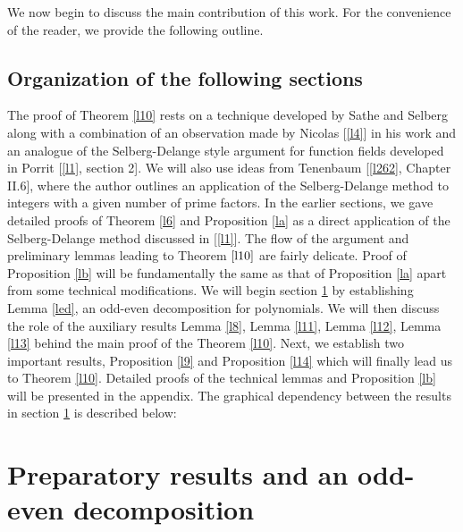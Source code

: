 \documentclass[12pt]{amsart}
\numberwithin{equation}{section}
\theoremstyle{remark}
\theoremstyle{remark}
\theoremstyle{definition}
\begin{document}
We now begin to discuss the main contribution of this work. For the convenience of the reader, we provide the following outline.
\subsection{Organization of the following sections} The proof of Theorem \ref{l10} rests on a technique developed by Sathe and Selberg along with a combination of an observation made by Nicolas [\ref{l4}] in his work and an analogue of the Selberg-Delange style argument for function fields developed in Porrit [\ref{l1}, section 2]. We will also use ideas from Tenenbaum [\ref{l262}, Chapter II.6], where the author outlines an application of the Selberg-Delange method to integers with a given number of prime factors. In the earlier sections, we gave detailed proofs of Theorem \ref{l6} and Proposition \ref{la} as a direct application of the Selberg-Delange method discussed in [\ref{l1}]. The flow of the argument and preliminary lemmas leading to Theorem $\ref{l10}$ are fairly delicate. Proof of Proposition \ref{lb} will be fundamentally the same as that of Proposition \ref{la} apart from some technical modifications. We will begin section \ref{ld} by establishing Lemma \ref{led}, an odd-even decomposition for polynomials. We will then discuss the role of the auxiliary results Lemma \ref{l8}, Lemma \ref{l11}, Lemma \ref{l12}, Lemma \ref{l13} behind the main proof of the Theorem \ref{l10}. Next, we establish two important results, Proposition \ref{l9} and Proposition \ref{l14} which will finally lead us to Theorem \ref{l10}. Detailed proofs of the technical lemmas and Proposition \ref{lb} will be presented in the appendix. The graphical dependency between the results in section \ref{ld} is described below:\\
\begin{center}

\end{center}
\medskip
\section{Preparatory results and an odd-even decomposition}\label{ld}
\end{document}
